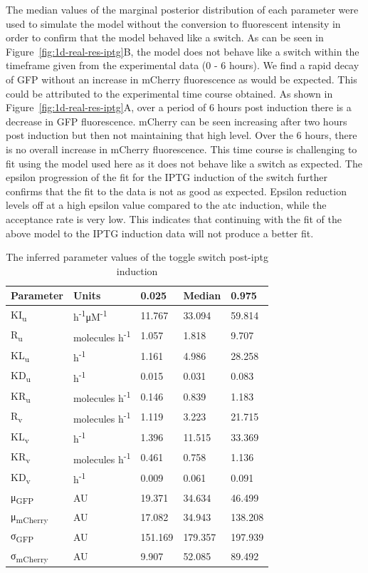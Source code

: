 The median values of the marginal posterior distribution of each parameter were used to simulate the model without the conversion to fluorescent intensity in order to confirm that the model behaved like a switch. As can be seen in Figure~\ref{fig:1d-real-res-iptg}B, the model does not behave like a switch within the timeframe given from the experimental data (0 - 6 hours). We find a rapid decay of GFP without an increase in mCherry fluorescence as would be expected. This could be attributed to the experimental time course obtained. As shown in Figure~\ref{fig:1d-real-res-iptg}A, over a period of 6 hours post induction there is a decrease in GFP fluorescence. mCherry can be seen increasing after two hours post induction but then not maintaining that high level. Over the 6 hours, there is no overall increase in mCherry fluorescence. This time course is challenging to fit using the model used here as it does not behave like a switch as expected. The epsilon progression of the fit for the IPTG induction of the switch further confirms that the fit to the data is not as good as expected. Epsilon reduction levels off at a high epsilon value compared to the \acrshort{atc} induction, while the acceptance rate is very low. This indicates that continuing with the fit of the above model to the IPTG induction data will not produce a better fit.   


\begin{table}[tb]
\centering
\caption{The inferred parameter values of the toggle switch post-\acrshort{iptg} induction}
\label{tab:inf_params_iptg}
\begin{tabular}{@{}lllll@{}}
\toprule
Parameter & Units &0.025 & Median & 0.975 \\ \midrule
KI\textsubscript{u} &h\textsuperscript{-1}μM\textsuperscript{-1}& 11.767 & 33.094 & 59.814 \\
R\textsubscript{u} &molecules h\textsuperscript{-1}& 1.057 & 1.818 & 9.707 \\
KL\textsubscript{u} &h\textsuperscript{-1}& 1.161 & 4.986 & 28.258 \\
KD\textsubscript{u} &h\textsuperscript{-1}& 0.015 & 0.031 & 0.083 \\
KR\textsubscript{u} &molecules h\textsuperscript{-1}& 0.146 & 0.839 & 1.183 \\
R\textsubscript{v} &molecules h\textsuperscript{-1}& 1.119 & 3.223 & 21.715 \\
KL\textsubscript{v} &h\textsuperscript{-1}& 1.396 & 11.515 & 33.369 \\
KR\textsubscript{v} &molecules h\textsuperscript{-1}& 0.461 & 0.758 & 1.136 \\
KD\textsubscript{v} &h\textsuperscript{-1}& 0.009 & 0.061 & 0.091 \\
μ\textsubscript{GFP} &AU& 19.371 & 34.634 & 46.499 \\
μ\textsubscript{mCherry} &AU& 17.082 & 34.943 & 138.208\\
σ\textsubscript{GFP} &AU& 151.169 & 179.357 & 197.939 \\
σ\textsubscript{mCherry} &AU& 9.907 & 52.085 & 89.492 \\ \bottomrule
\end{tabular}
\end{table}


